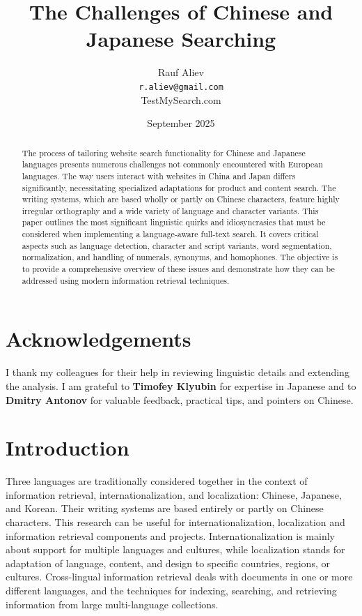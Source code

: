 \documentclass[11pt]{article}
\title{The Challenges of Chinese and Japanese Searching}
\author{Rauf Aliev \\ \texttt{r.aliev@gmail.com} \\ TestMySearch.com}
\date{September 2025}
\begin{document}
\maketitle

\begin{abstract}
The process of tailoring website search functionality for Chinese and Japanese languages presents numerous challenges not commonly encountered with European languages. The way users interact with websites in China and Japan differs significantly, necessitating specialized adaptations for product and content search. The writing systems, which are based wholly or partly on Chinese characters, feature highly irregular orthography and a wide variety of language and character variants. This paper outlines the most significant linguistic quirks and idiosyncrasies that must be considered when implementing a language-aware full-text search. It covers critical aspects such as language detection, character and script variants, word segmentation, normalization, and handling of numerals, synonyms, and homophones. The objective is to provide a comprehensive overview of these issues and demonstrate how they can be addressed using modern information retrieval techniques.
\end{abstract}

\newpage
\tableofcontents
\newpage

\section*{Acknowledgements}
I thank my colleagues for their help in reviewing linguistic details and extending the analysis. I am grateful to \textbf{Timofey Klyubin} for expertise in Japanese and to \textbf{Dmitry Antonov} for valuable feedback, practical tips, and pointers on Chinese.

\section{Introduction}
Three languages are traditionally considered together in the context of information retrieval, internationalization, and localization: Chinese, Japanese, and Korean. Their writing systems are based entirely or partly on Chinese characters. This research can be useful for internationalization, localization and information retrieval components and projects. Internationalization is mainly about support for multiple languages and cultures, while localization stands for adaptation of language, content, and design to specific countries, regions, or cultures. Cross-lingual information retrieval deals with documents in one or more different languages, and the techniques for indexing, searching, and retrieving information from large multi-language collections.
\end{document}
